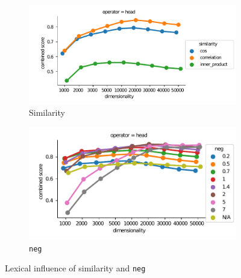 \begin{figure}[b]
  \centering

  \begin{subfigure}[t]{0.49\textwidth}
    \hspace{-20pt}
    \includegraphics[width=1.1\textwidth]{supplement/figures/lexical-interaction-similarity}

    \caption{Similarity}
    \label{fig:lexical-similarity}
  \end{subfigure}
  \begin{subfigure}[t]{0.49\textwidth}
    \includegraphics[width=\textwidth]{supplement/figures/lexical-interaction-neg}

    \caption{\texttt{neg}}
    \label{fig:lexical-neg}
  \end{subfigure}
  \caption{Lexical influence of similarity and \texttt{neg}}
\end{figure}
